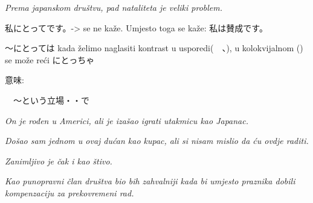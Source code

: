 	\textit{Prema japanskom društvu, pad nataliteta je veliki problem.}
				

		私にとってです。-> se ne kaže. 
		Umjesto toga se kaže: 私は賛成です。
		
		〜にとっては kada želimo naglasiti kontrast u usporedi(　、), u kolokvijalnom () se može reći にとっちゃ


	\newpage
	
	意味:
	
	　〜という立場・・で
					
		
	\begin{reibun}
	\end{reibun}
	
	\textit{On je rođen u Americi, ali je izašao igrati utakmicu kao Japanac.}
	\begin{reibun}

\textit{Došao sam jednom u ovaj dućan kao kupac, ali si nisam mislio da ću ovdje raditi.}
\end{reibun}

\begin{reibun}
\end{reibun}

\textit{Zanimljivo je čak i kao štivo.}
\begin{reibun}
	\end{reibun}
	
	\textit{Kao punopravni član društva bio bih zahvalniji kada bi umjesto praznika dobili kompenzaciju za prekovremeni rad.}

	

	
	\begin{reibun}
	
	\end{reibun}

